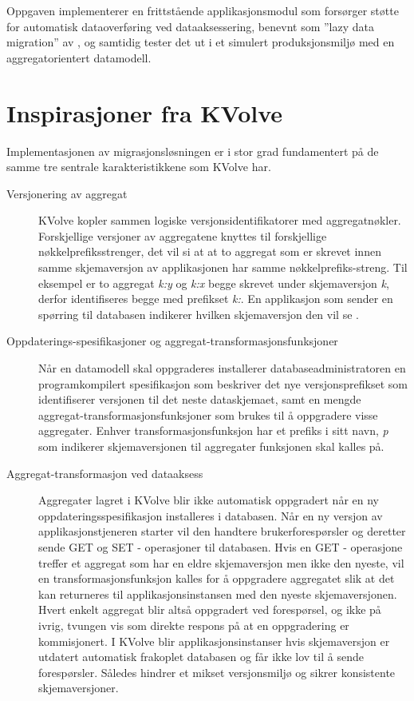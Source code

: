 Oppgaven implementerer en frittstående applikasjonsmodul som forsørger støtte for automatisk dataoverføring ved dataaksessering, benevnt som ''lazy data migration'' av \cite{saur2016}, og samtidig tester det ut i et simulert produksjonsmiljø med en aggregatorientert datamodell.

\section{Inspirasjoner fra KVolve}

Implementasjonen av migrasjonsløsningen er i stor grad fundamentert på de samme tre sentrale karakteristikkene som KVolve har.

\begin{description}
  \item [Versjonering av aggregat] KVolve kopler sammen logiske versjonsidentifikatorer med aggregatnøkler. Forskjellige versjoner av aggregatene knyttes til forskjellige nøkkel\-prefiks\-strenger, det vil si at at to aggregat som er skrevet innen samme skjemaversjon av applikasjonen har samme nøkkelprefiks-streng. Til eksempel er to aggregat \emph{k:y} og \emph{k:x} begge skrevet under skjemaversjon \emph{k}, derfor identifiseres begge med prefikset \emph{k:}. En applikasjon som sender en spørring til databasen indikerer hvilken skjemaversjon den vil se \citep{saur2016}.
  \item [Oppdaterings-spesifikasjoner og aggregat-transformasjonsfunksjoner] Når en datamodell skal oppgraderes installerer databaseadministratoren en programkompilert spesifikasjon som beskriver det nye versjonsprefikset som identifiserer versjonen til det neste dataskjemaet, samt en mengde aggregat-transformasjonsfunksjoner som brukes til å oppgradere visse aggregater. Enhver transformasjonsfunksjon har et prefiks i sitt navn, \emph{p} som indikerer skjemaversjonen til aggregater funksjonen skal kalles på.
  \item [Aggregat-transformasjon ved dataaksess] Aggregater lagret i KVolve blir ikke automatisk oppgradert når en ny oppdateringsspesifikasjon installeres i databasen. Når en ny versjon av applikasjonstjeneren starter vil den handtere brukerforespørsler og deretter sende GET og SET - operasjoner til databasen. Hvis en GET - operasjone treffer et aggregat som har en eldre skjemaversjon men ikke den nyeste, vil en transformasjonsfunksjon kalles for å oppgradere aggregatet slik at det kan returneres til applikasjonsinstansen med den nyeste skjemaversjonen. Hvert enkelt aggregat blir altså oppgradert ved forespørsel, og ikke på ivrig, tvungen vis som direkte respons på at en oppgradering er kommisjonert. I KVolve blir applikasjonsinstanser hvis skjemaversjon er utdatert automatisk frakoplet databasen og får ikke lov til å sende forespørsler. Således hindrer \cite{saur2016} et mikset versjonsmiljø og sikrer konsistente skjemaversjoner.
\end{description}

